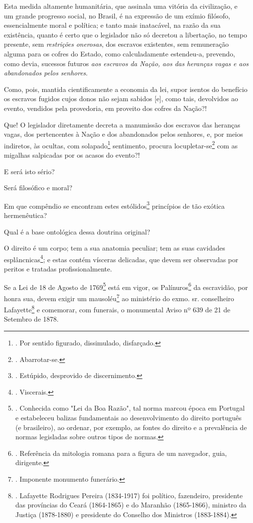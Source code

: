 Esta medida altamente humanitária, que assinala uma vitória da
civilização, e um grande progresso social, no Brasil, é na expressão de
um exímio filósofo, essencialmente moral e política; e tanto mais
inatacável, na razão da sua existência, quanto é certo que o legislador
não só decretou a libertação, no tempo presente, sem \emph{restrições
onerosas}, dos escravos existentes, sem remuneração alguma para os
cofres do Estado, como calculadamente estendeu-a, prevendo, como devia,
sucessos futuros \emph{aos escravos da Nação, aos das heranças vagas e
aos abandonados pelos senhores}.

Como, pois, mantida cientificamente a economia da lei, supor isentos do
benefício os escravos fugidos cujos donos não sejam sabidos {[}e{]},
como tais, devolvidos ao evento, vendidos pela provedoria, em proveito
dos cofres da Nação?!

Que! O legislador diretamente decreta a manumissão dos escravos das
heranças vagas, dos pertencentes à Nação e dos abandonados pelos
senhores, e, por meios indiretos, às ocultas, com solapado\footnote{.
  Por sentido figurado, dissimulado, disfarçado.} sentimento, procura
locupletar-se\footnote{. Abarrotar-se.} com as migalhas salpicadas por
os acasos do evento?!

E será isto sério?

Será filosófico e moral?

Em que compêndio se encontram estes estólidos\footnote{. Estúpido,
  desprovido de discernimento.} princípios de tão exótica hermenêutica?

Qual é a base ontológica dessa doutrina original?

O direito é um corpo; tem a sua anatomia peculiar; tem as suas cavidades
esplâncnicas\footnote{. Viscerais.}; e estas contém vísceras delicadas,
que devem ser observadas por peritos e tratadas profissionalmente.

Se a Lei de 18 de Agosto de 1769\footnote{. Conhecida como "Lei da Boa
  Razão", tal norma marcou época em Portugal e estabeleceu balizas
  fundamentais ao desenvolvimento do direito português (e brasileiro),
  ao ordenar, por exemplo, as fontes do direito e a prevalência de
  normas legisladas sobre outros tipos de normas.} está em vigor, os
Palínuros\footnote{. Referência da mitologia romana para a figura de um
  navegador, guia, dirigente.} da escravidão, por honra sua, devem
exigir um mausoléu\footnote{. Imponente monumento funerário.} ao
ministério do exmo. sr. conselheiro Lafayette\footnote{. Lafayette
  Rodrigues Pereira (1834-1917) foi político, fazendeiro, presidente das
  províncias do Ceará (1864-1865) e do Maranhão (1865-1866), ministro da
  Justiça (1878-1880) e presidente do Conselho dos Ministros
  (1883-1884).} e comemorar, com funerais, o monumental Aviso nº 639 de
21 de Setembro de 1878.

